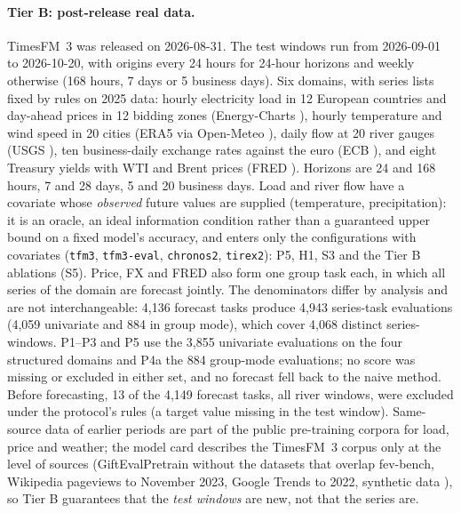 \paragraph{Tier B: post-release real data.} TimesFM~3 was released on 2026-08-31. The test windows run from 2026-09-01 to
2026-10-20, with origins every 24 hours for 24-hour horizons and weekly otherwise (168 hours, 7 days or 5 business days). Six domains, with
series lists fixed by rules on 2025 data: hourly electricity load in 12 European countries and day-ahead prices in 12 bidding zones
(Energy-Charts \citep{energycharts2026}), hourly temperature and wind speed in 20 cities (ERA5 via Open-Meteo
\citep{hersbach2020era5,zippenfenig2023openmeteo}), daily flow at 20 river gauges (USGS \citep{usgs2026nwis}), ten business-daily exchange rates
against the euro (ECB \citep{ecb2026dataportal}), and eight Treasury yields with WTI and Brent prices (FRED \citep{fred2026}). Horizons are 24 and
168 hours, 7 and 28 days, 5 and 20 business days. Load and river flow have a covariate whose \emph{observed} future values are
supplied (temperature, precipitation): it is an oracle, an ideal information condition rather than a guaranteed upper bound on a fixed model's accuracy, and enters only the configurations with covariates (\texttt{tfm3}, \texttt{tfm3-eval}, \texttt{chronos2}, \texttt{tirex2}): P5, H1, S3 and the Tier B ablations (S5). Price, FX and FRED also
form one group task each, in which all series of the domain are forecast jointly. The denominators differ by analysis and are
not interchangeable: 4{,}136 forecast tasks produce 4{,}943 series-task evaluations (4{,}059 univariate and 884 in group mode),
which cover 4{,}068 distinct series-windows. P1--P3 and P5 use the 3{,}855 univariate evaluations on the four structured domains
and P4a the 884 group-mode evaluations; no score was missing or excluded in either set, and no forecast fell back to the naive
method. Before forecasting, 13 of the 4{,}149 forecast tasks, all river windows, were excluded under the protocol's rules (a target value missing in the
test window). Same-source data of earlier periods are part of
the public pre-training corpora for load, price and weather; the model card describes the TimesFM~3 corpus only at the level of sources (GiftEvalPretrain without the
datasets that overlap fev-bench, Wikipedia pageviews to November 2023, Google Trends to 2022, synthetic data
\citep{timesfm2026hf}), so Tier B guarantees
that the \emph{test windows} are new, not that the series are.

